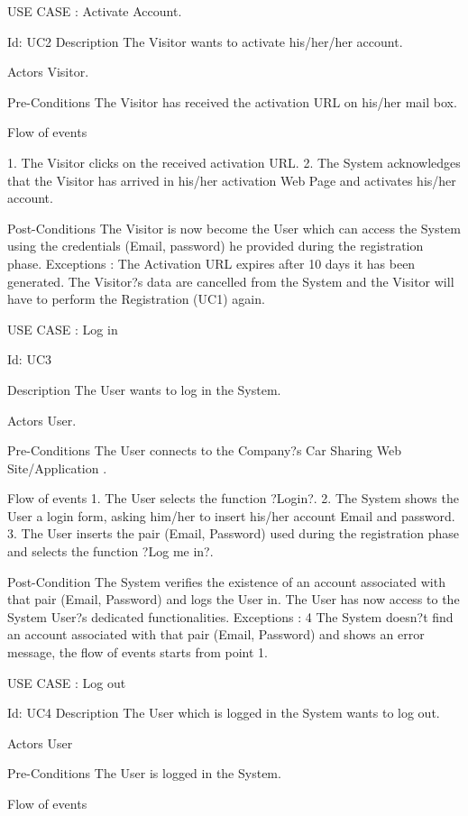 USE CASE : Activate Account.

Id:  UC2
Description
The Visitor wants to activate his/her/her account.

Actors
Visitor.

Pre-Conditions
The Visitor has received the activation URL on his/her mail box.



Flow of events

1. The Visitor clicks on the received activation URL.
2. The System acknowledges that the Visitor has arrived in his/her activation Web Page and activates his/her account.

Post-Conditions
The Visitor is now become the User which can access the System using the credentials (Email, password) he provided during the registration phase.
Exceptions :
The Activation URL expires after 10 days it has been generated. The Visitor?s data are cancelled from the System and the Visitor will have to perform the Registration (UC1) again.

USE CASE : Log in

Id:  UC3

Description
The User wants to log in the System.

Actors
User.

Pre-Conditions
The User connects to the Company?s Car Sharing Web Site/Application .

Flow of events
1. The User selects the function ?Login?.
2. The System shows the User a login form, asking him/her to insert his/her account Email and password.
3. The User inserts the pair (Email, Password) used during the registration phase and selects the function ?Log me in?.

Post-Condition
The System verifies the existence of an account associated with that pair (Email, Password) and logs the User in.
 The User has now access to the System User?s dedicated functionalities.
Exceptions :
4 	The System doesn?t find an account associated with that pair (Email, Password) and   shows an error message, the flow of events starts from point 1.

USE CASE : Log out

Id:  UC4
Description
The User which is logged in the System wants to log out.

Actors
User

Pre-Conditions
The User is logged in the System.



Flow of events

